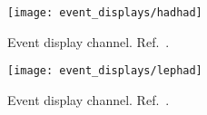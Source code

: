 \begin{figure}[p]
  \centering

  \texttt{[image: event\_displays/hadhad]}

  \caption{Event display \hadhad channel. Ref.~\cite{HDBS-2018-40}.}
  \label{fig:event_display_hadhad}
\end{figure}

\begin{figure}[p]
  \centering

  \texttt{[image: event\_displays/lephad]}

  \caption{Event display \lephad channel. Ref.~\cite{HDBS-2018-40}.}
  \label{fig:event_display_lephad}
\end{figure}

